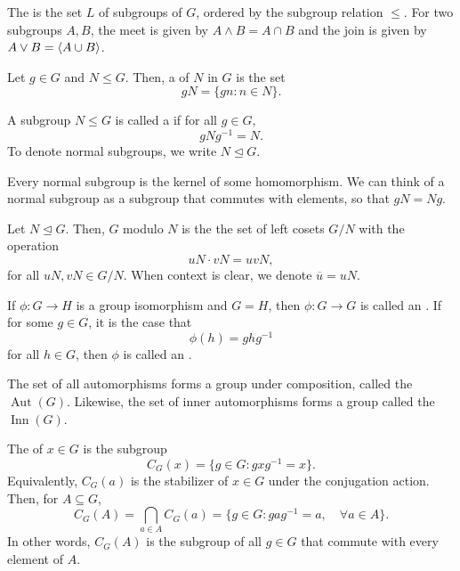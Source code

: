 \documentclass[class=report, crop=false]{standalone}
\begin{document}
\begin{definition}
    The  is the set $L$ of subgroups of $G$, ordered by the subgroup relation $\le$. For two subgroups $A,B$, the meet is given by $A\land B=A\cap B$ and the join is given by $A\lor B=\left\langle A\cup B\right\rangle$.
\end{definition}

\begin{definition}
    Let $g\in G$ and $N\le G$. Then, a  of $N$ in $G$ is the set
    \[gN = \{gn : n\in N\}.\]
\end{definition}

\begin{definition}
    A subgroup $N\le G$ is called a  if for all $g\in G$,
    \[gNg^{-1} = N.\]
    To denote normal subgroups, we write $N\trianglelefteq G$.

    Every normal subgroup is the kernel of some homomorphism. We can think of a normal subgroup as a subgroup that commutes with elements, so that $gN=Ng$.
\end{definition}

\begin{definition}
    Let $N\trianglelefteq G$. Then,  $G$ modulo $N$ is the the set of left cosets $G/N$ with the operation
    \[uN \cdot vN = uvN,\]
    for all $uN,vN\in G/N$. When context is clear, we denote $\overline{u} = uN$.
\end{definition}

\begin{definition2}
    If $\phi: G\to H$ is a group isomorphism and $G=H$, then $\phi: G\to G$ is called an . If for some $g\in G$, it is the case that
    \[\phi(h)=ghg^{-1}\]
    for all $h\in G$, then $\phi$ is called an .

    The set of all automorphisms forms a group under composition, called the  $\operatorname{Aut}(G)$. Likewise, the set of inner automorphisms forms a group called the  $\operatorname{Inn}(G)$.
\end{definition2}

\begin{definition1}
    The  of $x\in G$ is the subgroup
    \[C_G(x) = \{g\in G: gxg^{-1} = x\}.\]
    Equivalently, $C_G(a)$ is the stabilizer of $x\in G$ under the conjugation action. Then, for $A\subseteq G$,
    \[C_G(A) = \bigcap_{a\in A} C_G(a) = \{g\in G: gag^{-1} = a, \quad \forall a\in A\}.\]
    In other words, $C_G(A)$ is the subgroup of all $g\in G$ that commute with every element of $A$.
\end{definition1}
\end{document}
